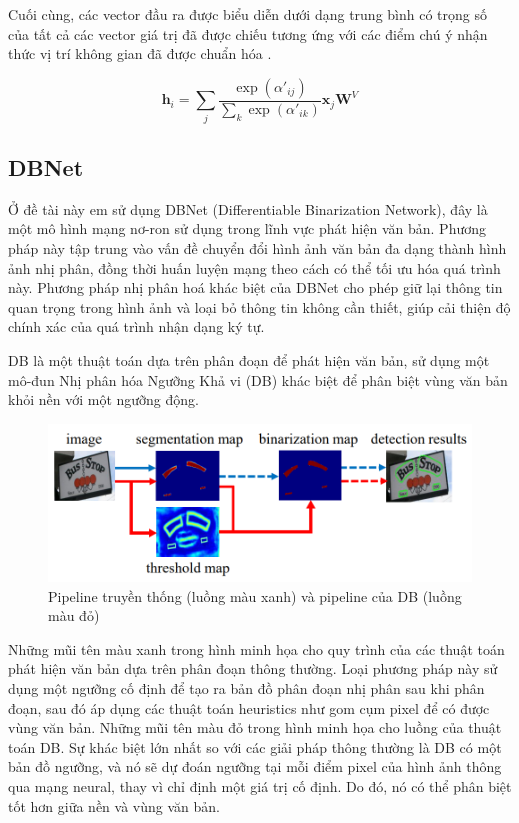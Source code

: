 Cuối cùng, các vector đầu ra được biểu diễn dưới dạng trung bình có trọng số của tất cả các vector giá trị đã được chiếu tương ứng với các điểm chú ý nhận thức vị trí không gian đã được chuẩn hóa \cite{xu2022layoutlmv2}.

\[
    \mathbf{h}_i = \sum_j \frac{\exp(\alpha'_{ij})}{\sum_k \exp(\alpha'_{ik})} \mathbf{x}_j \mathbf{W}^V    
\]

\subsection{DBNet}
Ở đề tài này em sử dụng DBNet \cite{liao2019realtime} (Differentiable Binarization Network), đây là một mô hình mạng nơ-ron sử dụng trong lĩnh vực phát hiện văn bản. Phương pháp này tập trung vào vấn đề chuyển đổi hình ảnh văn bản đa dạng thành hình ảnh nhị phân, đồng thời huấn luyện mạng theo cách có thể tối ưu hóa quá trình này. Phương pháp nhị phân hoá khác biệt của DBNet cho phép giữ lại thông tin quan trọng trong hình ảnh và loại bỏ thông tin không cần thiết, giúp cải thiện độ chính xác của quá trình nhận dạng ký tự.

DB là một thuật toán dựa trên phân đoạn để phát hiện văn bản, sử dụng một mô-đun Nhị phân hóa Ngưỡng Khả vi (DB) khác biệt để phân biệt vùng văn bản khỏi nền với một ngưỡng động.

\begin{figure}[h]
    \includegraphics[scale=0.5]{images/tradition-db-pipeline.png}
    \centering
    \caption{Pipeline truyền thống (luồng màu xanh) và pipeline của DB (luồng màu đỏ) }
    \label{}
\end{figure}

Những mũi tên màu xanh trong hình minh họa cho quy trình của các thuật toán phát hiện văn bản dựa trên phân đoạn thông thường. Loại phương pháp này sử dụng một ngưỡng cố định để tạo ra bản đồ phân đoạn nhị phân sau khi phân đoạn, sau đó áp dụng các thuật toán heuristics như gom cụm pixel để có được vùng văn bản.
Những mũi tên màu đỏ trong hình minh họa cho luồng của thuật toán DB. Sự khác biệt lớn nhất so với các giải pháp thông thường là DB có một bản đồ ngưỡng, và nó sẽ dự đoán ngưỡng tại mỗi điểm pixel của hình ảnh thông qua mạng neural, thay vì chỉ định một giá trị cố định. Do đó, nó có thể phân biệt tốt hơn giữa nền và vùng văn bản.

